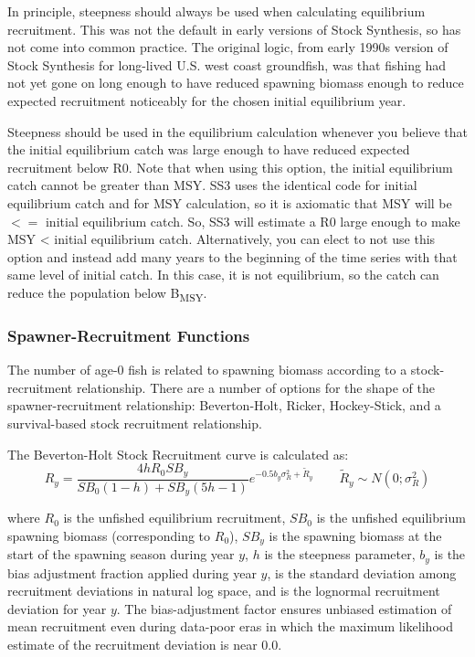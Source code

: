 In principle, steepness should always be used when calculating equilibrium recruitment. This was not the default in early versions of Stock Synthesis, so has not come into common practice. The original logic, from early 1990s version of Stock Synthesis for long-lived U.S. west coast groundfish, was that fishing had not yet gone on long enough to have reduced spawning biomass enough to reduce expected recruitment noticeably for the chosen initial equilibrium year.

Steepness should be used in the equilibrium calculation whenever you believe that the initial equilibrium catch was large enough to have reduced expected recruitment below R0. Note that when using this option, the initial equilibrium catch cannot be greater than MSY. SS3 uses the identical code for initial equilibrium catch and for MSY calculation, so it is axiomatic that MSY will be $<=$ initial equilibrium catch. So, SS3 will estimate a R0 large enough to make MSY < initial equilibrium catch. Alternatively, you can elect to not use this option and instead add many years to the beginning of the time series with that same level of initial catch. In this case, it is not equilibrium, so the catch can reduce the population below B\textsubscript{MSY}.

\subsubsection{Spawner-Recruitment Functions}
The number of age-0 fish is related to spawning biomass according to a stock-recruitment relationship. There are a number of options for the shape of the spawner-recruitment relationship: Beverton-Holt, Ricker, Hockey-Stick, and a survival-based stock recruitment relationship.

\hypertarget{BH}{}
The Beverton-Holt Stock Recruitment curve is calculated as:
\begin{equation}{R_y = \frac{4hR_0SB_y}{SB_0(1-h)+SB_y(5h-1)}e^{-0.5b_y\sigma^2_R+\tilde{R}_y}\qquad  \tilde{R}_y\sim N(0;\sigma^2_R)}
\end{equation}

where $R_0$ is the unfished equilibrium recruitment, $SB_0$ is the unfished equilibrium spawning biomass (corresponding to $R_0$), $SB_y$ is the spawning biomass at the start of the spawning season during year $y$, $h$ is the steepness parameter, $b_y$ is the bias adjustment fraction applied during year $y$, is the standard deviation among recruitment deviations in natural log space, and is the lognormal recruitment deviation for year $y$. The bias-adjustment factor \citep{methot-adjusting-2011} ensures unbiased estimation of mean recruitment even during data-poor eras in which the maximum likelihood estimate of the recruitment deviation is near 0.0.


